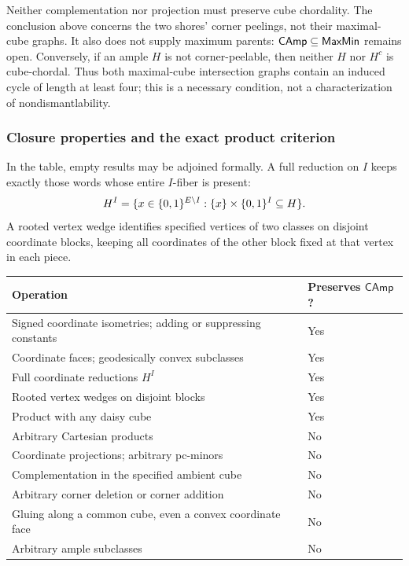 Neither complementation nor projection must preserve cube chordality.
The conclusion above concerns the two shores' corner peelings, not their
maximal-cube graphs. It also does not supply maximum parents:
$\mathsf{CAmp}\subseteq\mathsf{MaxMin}$ remains open.
Conversely, if an ample $H$ is not corner-peelable, then neither $H$ nor
$H^c$ is cube-chordal. Thus both maximal-cube intersection graphs contain
an induced cycle of length at least four; this is a necessary condition,
not a characterization of nondismantlability.

\subsubsection{Closure properties and the exact product criterion}

In the table, empty results may be adjoined formally. A full reduction on
$I$ keeps exactly those words whose entire $I$-fiber is present:
\[
 H^I=\{x\in\{0,1\}^{E\setminus I}:\{x\}\times\{0,1\}^I\subseteq H\}.
\]
A rooted vertex wedge identifies specified vertices of two classes on
disjoint coordinate blocks, keeping all coordinates of the other block
fixed at that vertex in each piece.

\begin{center}
\begin{tabular}{@{}p{.72\linewidth}l@{}}
\toprule
Operation & Preserves $\mathsf{CAmp}$?\\
\midrule
Signed coordinate isometries; adding or suppressing constants & Yes\\
Coordinate faces; geodesically convex subclasses & Yes\\
Full coordinate reductions $H^I$ & Yes\\
Rooted vertex wedges on disjoint blocks & Yes\\
Product with any daisy cube & Yes\\
Arbitrary Cartesian products & No\\
Coordinate projections; arbitrary pc-minors & No\\
Complementation in the specified ambient cube & No\\
Arbitrary corner deletion or corner addition & No\\
Gluing along a common cube, even a convex coordinate face & No\\
Arbitrary ample subclasses & No\\
\bottomrule
\end{tabular}
\end{center}

